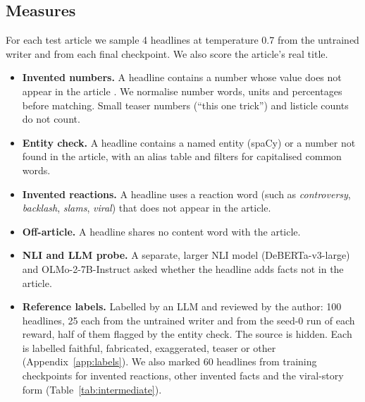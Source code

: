\subsection{Measures}
For each test article we sample 4 headlines at temperature 0.7 from the untrained writer and from each final checkpoint. We also score the article's real title.
\begin{itemize}
\item \textbf{Invented numbers.} A headline contains a number whose value does not appear in the article \citep{zhao2020quantity}. We normalise number words, units and percentages before matching. Small teaser numbers (``this one trick'') and listicle counts do not count.
\item \textbf{Entity check.} A headline contains a named entity (spaCy) \citep{nan2021entity} or a number not found in the article, with an alias table and filters for capitalised common words.
\item \textbf{Invented reactions.} A headline uses a reaction word (such as \emph{controversy}, \emph{backlash}, \emph{slams}, \emph{viral}) that does not appear in the article.
\item \textbf{Off-article.} A headline shares no content word with the article.
\item \textbf{NLI and LLM probe.} A separate, larger NLI model (DeBERTa-v3-large) and OLMo-2-7B-Instruct \citep{olmo2025olmo2} asked whether the headline adds facts not in the article.
\item \textbf{Reference labels.} Labelled by an LLM and reviewed by the author: 100 headlines, 25 each from the untrained writer and from the seed-0 run of each reward, half of them flagged by the entity check. The source is hidden. Each is labelled faithful, fabricated, exaggerated, teaser or other (Appendix~\ref{app:labels}). We also marked 60 headlines from training checkpoints for invented reactions, other invented facts and the viral-story form (Table~\ref{tab:intermediate}).
\end{itemize}

